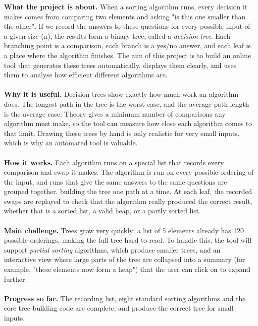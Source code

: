 ﻿\documentclass[10pt,a4paper]{article}
\begin{document}
\textbf{What the project is about.}
When a sorting algorithm runs, every decision it makes comes from comparing two elements
and asking "is this one smaller than the other". If we record the answers to these
questions for every possible input of a given size (n), the results form a binary tree, called
a \emph{decision tree}. Each branching point is a comparison, each branch is a yes/no
answer, and each leaf is a place where the algorithm finishes. The aim of this project is
to build an online tool that generates these trees automatically, displays them clearly,
and uses them to analyse how efficient different algorithms are.
\\
\\
\textbf{Why it is useful.}
Decision trees show exactly how much work an algorithm does. The longest path in the tree
is the worst case, and the average path length is the average case. Theory gives a minimum number of comparisons any algorithm must make, so the tool can
measure how close each algorithm comes to that limit. Drawing these trees by hand is only
realistic for very small inputs, which is why an automated tool is valuable.
\\
\\
\textbf{How it works.}
Each algorithm runs on a special list that records every comparison and swap it makes.
The algorithm is run on every possible ordering of the input, and runs that give the same
answers to the same questions are grouped together, building the tree one path at a time.
At each leaf, the recorded swaps are replayed to check that the algorithm really produced
the correct result, whether that is a sorted list, a valid heap, or a partly sorted list.
\\
\\
\textbf{Main challenge.}
Trees grow very quickly: a list of 5 elements already has 120 possible orderings, making
the full tree hard to read. To handle this, the tool will support \emph{partial sorting}
algorithms, which produce smaller trees, and an interactive view where large parts of the
tree are collapsed into a summary (for example, "these elements now form a heap") that
the user can click on to expand further.
\\
\\
\textbf{Progress so far.}
The recording list, eight standard sorting algorithms and the core tree-building code are
complete, and produce the correct tree for small inputs.
\\
\\
\end{document}
